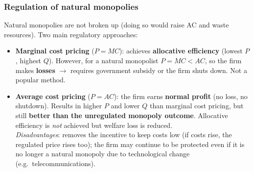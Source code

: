\documentclass[a4paper,12pt]{article}
\begin{document}
\subsubsection*{Regulation of natural monopolies}
Natural monopolies are not broken up (doing so would raise AC and waste resources). Two main regulatory approaches:
\begin{itemize}
  \item \textbf{Marginal cost pricing} ($P = MC$): achieves \textbf{allocative efficiency} (lowest $P$, highest $Q$). However, for a natural monopolist $P = MC < AC$, so the firm makes \textbf{losses} $\to$ requires government subsidy or the firm shuts down. Not a popular method.
  \item \textbf{Average cost pricing} ($P = AC$): the firm earns \textbf{normal profit} (no loss, no shutdown). Results in higher $P$ and lower $Q$ than marginal cost pricing, but still \textbf{better than the unregulated monopoly outcome}. Allocative efficiency is \textit{not} achieved but welfare loss is reduced.\\
  \textit{Disadvantages}: removes the incentive to keep costs low (if costs rise, the regulated price rises too); the firm may continue to be protected even if it is no longer a natural monopoly due to technological change (e.g.\ telecommunications).
\end{itemize}
\end{document}
